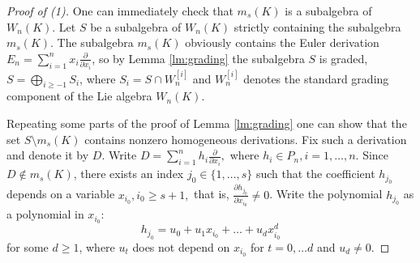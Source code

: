 \documentclass[12pt,a4paper]{amsart}
\theoremstyle{plain}
\theoremstyle{definition}
\begin{document}
\begin{proof}[Proof of (1)]
	One can immediately check that $m_s(K)$ is a subalgebra of $W_n(K)$. Let $S$ be a   subalgebra of $W_n(K)$ strictly containing the subalgebra  $m_s(K)$.
	The subalgebra $m_s(K)$ obviously contains the Euler derivation $E_n = \sum_{i=1}^n x_i \frac{\partial}{\partial x_i}$, so 
	by Lemma \ref{lm:grading} the subalgebra $S$ is graded, $S = \bigoplus_{i \ge -1} S_i$, where  $S_i=S\cap W_n^{[i]} $ and $W_n^{[i]}$ denotes the standard grading component of the Lie algebra $W_n(K)$.
	
	Repeating some parts of the proof of Lemma \ref{lm:grading} one  can show that the set $S \setminus m_s(K)$ contains nonzero  homogeneous derivations. Fix such a derivation and denote it by $D$.
	Write $D = \sum_{i=1}^n h_i \frac{\partial}{\partial x_i}, $ where  $h_i\in P_n, i=1, \ldots , n.$ Since $D \notin m_s(K)$, there exists an index $j_0 \in \{1, \dots, s\}$ such that the coefficient $h_{j_0}$ depends on a variable $x_{i_0}, i_0 \ge s + 1,$ that is, $\frac{\partial h_{j_0}}{\partial x_{i_0}}\not =0$. 	
	Write  the polynomial $h_{j_0}$ as a polynomial in  $x_{i_0}$:
	\[
	h_{j_0} = u_0 + u_1 x_{i_0} + \dots + u_d x_{i_0}^d
	\]
	for some $d \ge 1$, where $u_t$ does not depend on $x_{i_0}$ for $t=0,\dots d$  and $u_d \neq 0.$
	

\end{proof}
\end{document}
